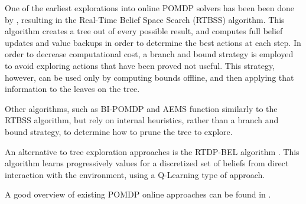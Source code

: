 One of the earliest explorations into online POMDP solvers has been been done by
\cite{cit:relworkonline1}, resulting in the Real-Time Belief Space Search (RTBSS) algorithm. This
algorithm creates a tree out of every possible result, and computes full belief updates and value
backups in order to determine the best actions at each step. In order to decrease computational
cost, a branch and bound strategy is employed to avoid exploring actions that have been proved not
useful. This strategy, however, can be used only by computing bounds offline, and then applying that
information to the leaves on the tree.

Other algorithms, such as BI-POMDP \cite{cit:relworkonlinebi} and AEMS \cite{cit:relworkonlineaems}
function similarly to the RTBSS algorithm, but rely on internal heuristics, rather than a branch and
bound strategy, to determine how to prune the tree to explore.

An alternative to tree exploration approaches is the RTDP-BEL algorithm \cite{cit:relworkonlineq}.
This algorithm learns progressively values for a discretized set of beliefs from direct interaction
with the environment, using a Q-Learning type of approach.

A good overview of existing POMDP online approaches can be found in \cite{cit:relworkonlineall}.

